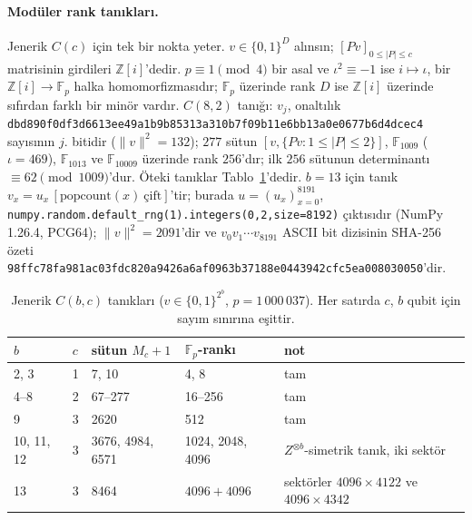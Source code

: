 \documentclass[aps,pra,onecolumn,superscriptaddress,nofootinbib,longbibliography,10pt]{revtex4-2}
\theoremstyle{definition}
\newcommand{\ZZ}{\mathbb Z}
\newcommand{\FF}{\mathbb F}
\begin{document}
\paragraph*{Modüler rank tanıkları.} Jenerik $C(c)$ için tek bir nokta yeter. $v\in\{0{,}1\}^D$ alınsın; $[Pv]_{0\le|P|\le c}$ matrisinin girdileri $\ZZ[i]$'dedir. $p\equiv1\pmod4$ bir asal ve $\iota^2\equiv-1$ ise $i\mapsto\iota$, bir $\ZZ[i]\to\FF_p$ halka homomorfizmasıdır; $\FF_p$ üzerinde rank $D$ ise $\ZZ[i]$ üzerinde sıfırdan farklı bir minör vardır. $C(8{,}2)$ tanığı: $v_j$, onaltılık \texttt{dbd890f0df3d6613\allowbreak ee49a1b9b85313a3\allowbreak 10b7f09b11e6bb13\allowbreak a0e0677b6d4dcec4} sayısının $j$. bitidir ($\|v\|^2=132$); $277$ sütun $[v,\{Pv:1\le|P|\le2\}]$, $\FF_{1009}$ ($\iota=469$), $\FF_{1013}$ ve $\FF_{10009}$ üzerinde rank $256$'dır; ilk $256$ sütunun determinantı $\equiv62\pmod{1009}$'dur. Öteki tanıklar Tablo~\ref{tab:fp}'dedir. $b=13$ için tanık $v_x=u_x\,[\mathrm{popcount}(x)\ \text{çift}]$'tir; burada $u=(u_x)_{x=0}^{8191}$, \texttt{numpy.random.default\_rng(1).\allowbreak integers(0,2,size=8192)} çıktısıdır (NumPy 1.26.4, PCG64); $\|v\|^2=2091$'dir ve $v_0v_1\cdots v_{8191}$ ASCII bit dizisinin SHA-256 özeti \texttt{98ffc78fa981ac03\allowbreak fdc820a9426a6af0\allowbreak 963b37188e044394\allowbreak 2cfc5ea008030050}'dir.

\begin{table}[h]
\caption{Jenerik $C(b,c)$ tanıkları ($v\in\{0{,}1\}^{2^b}$, $p=1\,000\,037$). Her satırda $c$, $b$ qubit için sayım sınırına eşittir.}\label{tab:fp}
\begin{tabular}{lllll}
\toprule
$b$ & $c$ & sütun $M_c+1$ & $\FF_p$-rankı & not\\
\midrule
2, 3 & 1 & 7, 10 & 4, 8 & tam\\
4--8 & 2 & 67--277 & 16--256 & tam\\
9 & 3 & 2620 & 512 & tam\\
10, 11, 12 & 3 & 3676, 4984, 6571 & 1024, 2048, 4096 & $Z^{\otimes b}$-simetrik tanık, iki sektör\\
13 & 3 & 8464 & $4096+4096$ & sektörler $4096\times4122$ ve $4096\times4342$\\
\bottomrule
\end{tabular}
\end{table}
\end{document}
